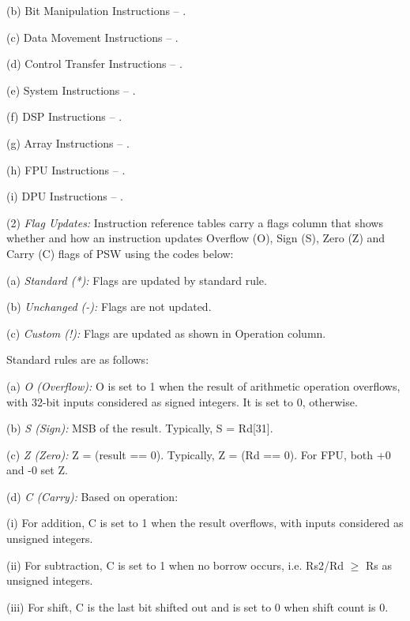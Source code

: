     (b) Bit Manipulation Instructions -- .

    (c) Data Movement Instructions -- .

    (d) Control Transfer Instructions -- .

    (e) System Instructions -- .

    (f) DSP Instructions -- .

    (g) Array Instructions -- .

    (h) FPU Instructions -- .

    (i) DPU Instructions -- .

\levelone
(2) \emph{Flag Updates:} %
Instruction reference tables carry a flags column that shows whether and how an instruction updates 
Overflow (O), Sign (S), Zero (Z) and Carry (C) flags of PSW using the codes below:

    \leveltwo
    (a) \emph{Standard (*):} %
    Flags are updated by standard rule.

    (b) \emph{Unchanged (-):} %
    Flags are not updated.

    (c) \emph{Custom (!):} %
    Flags are updated as shown in Operation column.

\levelone
Standard rules are as follows:

    \leveltwo
    (a) \emph{O (Overflow):} %
    O is set to 1 when the result of arithmetic operation overflows, with 32-bit inputs considered 
    as signed integers. It is set to 0, otherwise.

    (b) \emph{S (Sign):} %
    MSB of the result. Typically, S = Rd[31].

    (c) \emph{Z (Zero):} %
    Z = (result == 0). Typically, Z = (Rd == 0). For FPU, both +0 and -0 set Z.

    (d) \emph{C (Carry):} %
    Based on operation:

        \levelthree
        (i) For addition, C is set to 1 when the result overflows, with inputs considered as 
        unsigned integers.

        (ii) For subtraction, C is set to 1 when no borrow occurs, i.e. Rs2/Rd $\ge$ Rs as unsigned
        integers.

        (iii) For shift, C is the last bit shifted out and is set to 0 when shift count is 0.

